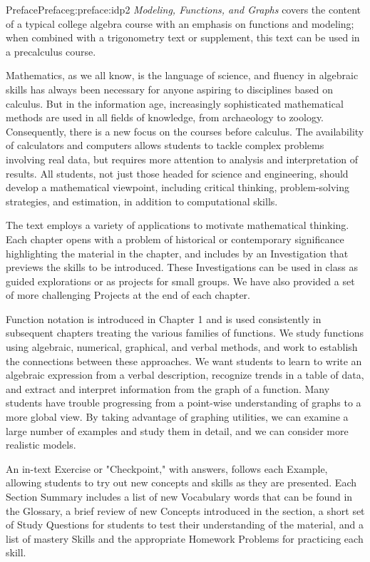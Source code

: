 \documentclass[oneside,10pt,]{book}
\numberwithin{equation}{section}
\begin{document}
\begin{preface}{Preface}{}{Preface}{}{}{g:preface:idp2}
\emph{Modeling, Functions, and Graphs} covers the content of a typical college algebra course with an emphasis on functions and modeling; when combined with a trigonometry text or supplement, this text can be used in a precalculus course.%
\par
Mathematics, as we all know, is the language of science, and fluency in algebraic skills has always been necessary for anyone aspiring to disciplines based on calculus. But in the information age, increasingly sophisticated mathematical methods are used in all fields of knowledge, from archaeology to zoology. Consequently, there is a new focus on the courses before calculus. The availability of calculators and computers allows students to tackle complex problems involving real data, but requires more attention to analysis and interpretation of results. All students, not just those headed for science and engineering, should develop a mathematical viewpoint, including critical thinking, problem-solving strategies, and estimation, in addition to computational skills.%
\par
The text employs a variety of applications to motivate mathematical thinking.  Each chapter opens with a problem of historical or contemporary significance highlighting the material in the chapter, and includes by an Investigation that previews the skills to be introduced. These Investigations can be used in class as guided explorations or as projects for small groups. We have also provided a set of more challenging Projects at the end of each chapter.%
\par
Function notation is introduced in Chapter 1 and is used consistently in subsequent chapters treating the various families of functions.  We study functions using algebraic, numerical, graphical, and verbal methods, and work to establish the connections between these approaches. We want students to learn to write an algebraic expression from a verbal description, recognize trends in a table of data, and extract and interpret information from the graph of a function.  Many students have trouble progressing from a point-wise understanding of graphs to a more global view. By taking advantage of graphing utilities, we can examine a large number of examples and study them in detail, and we can consider more realistic models.%
\par
An in-text Exercise or "Checkpoint," with answers, follows each Example, allowing students to try out new concepts and skills as they are presented.  Each Section Summary includes a list of new Vocabulary words that can be found in the Glossary, a brief review of new Concepts introduced in the section, a short set of Study Questions for students to test their understanding of the material, and a list of mastery Skills and the appropriate Homework Problems for practicing each skill.%

\end{preface}
\end{document}
